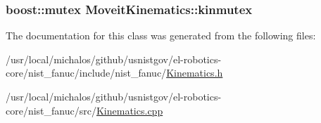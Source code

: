 \hypertarget{classMoveitKinematics_a94dd916f6d9a7074ebd00356975d51ea}{
\subsubsection[{kinmutex}]{\setlength{\rightskip}{0pt plus 5cm}boost\-::mutex Moveit\-Kinematics\-::kinmutex}}\label{classMoveitKinematics_a94dd916f6d9a7074ebd00356975d51ea}


The documentation for this class was generated from the following files\-:\begin{DoxyCompactItemize}
\item 
/usr/local/michalos/github/usnistgov/el-\/robotics-\/core/nist\-\_\-fanuc/include/nist\-\_\-fanuc/\hyperlink{Kinematics_8h}{Kinematics.\-h}\item 
/usr/local/michalos/github/usnistgov/el-\/robotics-\/core/nist\-\_\-fanuc/src/\hyperlink{Kinematics_8cpp}{Kinematics.\-cpp}\end{DoxyCompactItemize}
